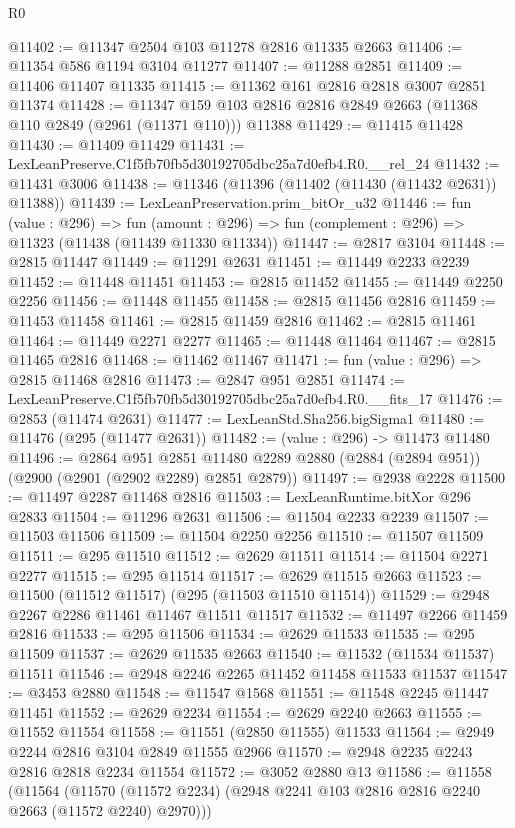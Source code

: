 \begin{lexlean}{R0}
\begin{coremodule}
@11402 := @11347 @2504 @103 @11278 @2816 @11335 @2663
@11406 := @11354 @586 @1194 @3104 @11277
@11407 := @11288 @2851
@11409 := @11406 @11407 @11335
@11415 := @11362 @161 @2816 @2818 @3007 @2851 @11374
@11428 := @11347 @159 @103 @2816 @2816 @2849 @2663 (@11368 @110 @2849 (@2961 (@11371 @110))) @11388
@11429 := @11415 @11428
@11430 := @11409 @11429
@11431 := LexLeanPreserve.C1f5fb70fb5d30192705dbc25a7d0efb4.R0.__rel_24
@11432 := @11431 @3006
@11438 := @11346 (@11396 (@11402 (@11430 (@11432 @2631)) @11388))
@11439 := LexLeanPreservation.prim_bitOr_u32
@11446 := fun (value : @296) =>
  fun (amount : @296) => fun (complement : @296) => @11323 (@11438 (@11439 @11330 @11334))
@11447 := @2817 @3104
@11448 := @2815 @11447
@11449 := @11291 @2631
@11451 := @11449 @2233 @2239
@11452 := @11448 @11451
@11453 := @2815 @11452
@11455 := @11449 @2250 @2256
@11456 := @11448 @11455
@11458 := @2815 @11456 @2816
@11459 := @11453 @11458
@11461 := @2815 @11459 @2816
@11462 := @2815 @11461
@11464 := @11449 @2271 @2277
@11465 := @11448 @11464
@11467 := @2815 @11465 @2816
@11468 := @11462 @11467
@11471 := fun (value : @296) => @2815 @11468 @2816
@11473 := @2847 @951 @2851
@11474 := LexLeanPreserve.C1f5fb70fb5d30192705dbc25a7d0efb4.R0.__fits_17
@11476 := @2853 (@11474 @2631)
@11477 := LexLeanStd.Sha256.bigSigma1
@11480 := @11476 (@295 (@11477 @2631))
@11482 := (value : @296) -> @11473 @11480
@11496 := @2864
    @951
    @2851
    @11480
    @2289
    @2880
    (@2884 (@2894 @951))
    (@2900 (@2901 (@2902 @2289) @2851 @2879))
@11497 := @2938 @2228
@11500 := @11497 @2287 @11468 @2816
@11503 := LexLeanRuntime.bitXor @296 @2833
@11504 := @11296 @2631
@11506 := @11504 @2233 @2239
@11507 := @11503 @11506
@11509 := @11504 @2250 @2256
@11510 := @11507 @11509
@11511 := @295 @11510
@11512 := @2629 @11511
@11514 := @11504 @2271 @2277
@11515 := @295 @11514
@11517 := @2629 @11515 @2663
@11523 := @11500 (@11512 @11517) (@295 (@11503 @11510 @11514))
@11529 := @2948 @2267 @2286 @11461 @11467 @11511 @11517
@11532 := @11497 @2266 @11459 @2816
@11533 := @295 @11506
@11534 := @2629 @11533
@11535 := @295 @11509
@11537 := @2629 @11535 @2663
@11540 := @11532 (@11534 @11537) @11511
@11546 := @2948 @2246 @2265 @11452 @11458 @11533 @11537
@11547 := @3453 @2880
@11548 := @11547 @1568
@11551 := @11548 @2245 @11447 @11451
@11552 := @2629 @2234
@11554 := @2629 @2240 @2663
@11555 := @11552 @11554
@11558 := @11551 (@2850 @11555) @11533
@11564 := @2949 @2244 @2816 @3104 @2849 @11555 @2966
@11570 := @2948 @2235 @2243 @2816 @2818 @2234 @11554
@11572 := @3052 @2880 @13
@11586 := @11558
    (@11564 (@11570 (@11572 @2234) (@2948 @2241 @103 @2816 @2816 @2240 @2663 (@11572 @2240) @2970)))

\end{coremodule}
\end{lexlean}

